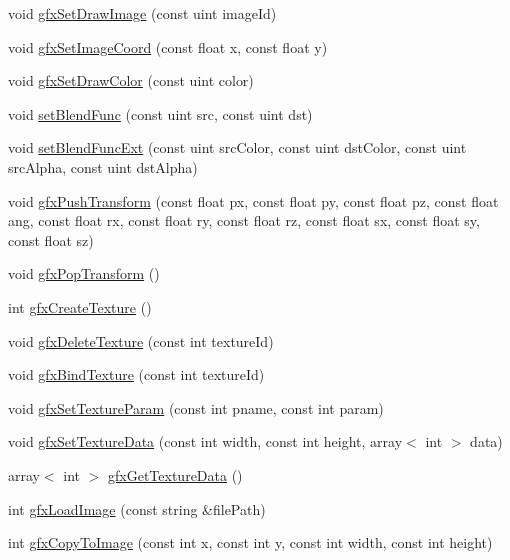 \begin{DoxyCompactItemize}
\item 
void \hyperlink{class_graphics_a37171416216a1987acd0bb1151305d24}{gfx\-Set\-Draw\-Image} (const uint image\-Id)
\item 
void \hyperlink{class_graphics_a4776704155fae941c1e00b728c4c1273}{gfx\-Set\-Image\-Coord} (const float x, const float y)
\item 
void \hyperlink{class_graphics_a572da31bea4f52560a79c9f8995efe07}{gfx\-Set\-Draw\-Color} (const uint color)
\item 
void \hyperlink{class_graphics_a7879ec3e855fe3603b905445478d43d4}{set\-Blend\-Func} (const uint src, const uint dst)
\item 
void \hyperlink{class_graphics_a95d1adf7b032a77c317cdbf58706f4e1}{set\-Blend\-Func\-Ext} (const uint src\-Color, const uint dst\-Color, const uint src\-Alpha, const uint dst\-Alpha)
\item 
void \hyperlink{class_graphics_a3afd1604ee96613fdd9abe048d7b155d}{gfx\-Push\-Transform} (const float px, const float py, const float pz, const float ang, const float rx, const float ry, const float rz, const float sx, const float sy, const float sz)
\item 
void \hyperlink{class_graphics_a42c1a339802e83ae73a6ed70bf02dba3}{gfx\-Pop\-Transform} ()
\item 
int \hyperlink{class_graphics_a0fa0ae6b61b9e8316d7f57232e7c42b6}{gfx\-Create\-Texture} ()
\item 
void \hyperlink{class_graphics_a73109350ad6cf05fbfde94272788305f}{gfx\-Delete\-Texture} (const int texture\-Id)
\item 
void \hyperlink{class_graphics_a721d597b712edd462fa38698e0843340}{gfx\-Bind\-Texture} (const int texture\-Id)
\item 
void \hyperlink{class_graphics_a18273ab11c76bd76effd4f19ae1f2b6d}{gfx\-Set\-Texture\-Param} (const int pname, const int param)
\item 
void \hyperlink{class_graphics_ab60f972ec484c0403eef31f923d8e38f}{gfx\-Set\-Texture\-Data} (const int width, const int height, array$<$ int $>$ data)
\item 
array$<$ int $>$ \hyperlink{class_graphics_a69728de0b6e16d77aa7552cb6abd7890}{gfx\-Get\-Texture\-Data} ()
\item 
int \hyperlink{class_graphics_ab2e439f6d42eb345b826901769238af7}{gfx\-Load\-Image} (const string \&file\-Path)
\item 
int \hyperlink{class_graphics_af086b4d98dad87d82fe34b5afa2436fb}{gfx\-Copy\-To\-Image} (const int x, const int y, const int width, const int height)

\end{DoxyCompactItemize}
